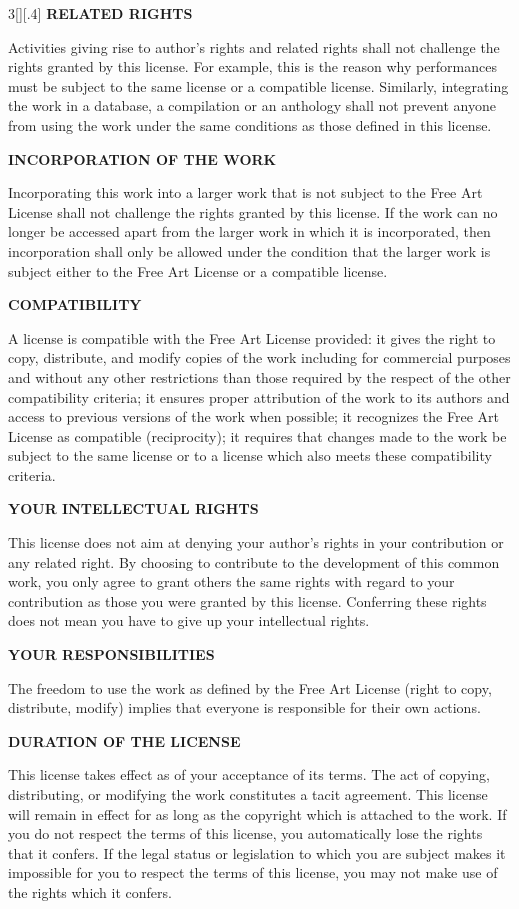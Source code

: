 \documentclass[8pt,a4paper]{article}
\begin{document}
\begin{multicols}{3}[][.4\paperwidth]
\textbf{RELATED RIGHTS}

Activities giving rise to author’s rights and related rights shall not challenge the rights granted by this license.
For example, this is the reason why performances must be subject to the same license or a compatible license. Similarly, integrating the work in a database, a compilation or an anthology shall not prevent anyone from using the work under the same conditions as those defined in this license.


\textbf{INCORPORATION OF THE WORK}

Incorporating this work into a larger work that is not subject to the Free Art License shall not challenge the rights granted by this license.
If the work can no longer be accessed apart from the larger work in which it is incorporated, then incorporation shall only be allowed under the condition that the larger work is subject either to the Free Art License or a compatible license.


\textbf{COMPATIBILITY}

A license is compatible with the Free Art License provided:
it gives the right to copy, distribute, and modify copies of the work including for commercial purposes and without any other restrictions than those required by the respect of the other compatibility criteria;
it ensures proper attribution of the work to its authors and access to previous versions of the work when possible;
it recognizes the Free Art License as compatible (reciprocity);
it requires that changes made to the work be subject to the same license or to a license which also meets these compatibility criteria.


\textbf{YOUR INTELLECTUAL RIGHTS}

This license does not aim at denying your author's rights in your contribution or any related right. By choosing to contribute to the development of this common work, you only agree to grant others the same rights with regard to your contribution as those you were granted by this license. Conferring these rights does not mean you have to give up your intellectual rights.


\textbf{YOUR RESPONSIBILITIES}

The freedom to use the work as defined by the Free Art License (right to copy, distribute, modify) implies that everyone is responsible for their own actions.


\textbf{DURATION OF THE LICENSE}

This license takes effect as of your acceptance of its terms. The act of copying, distributing, or modifying the work constitutes a tacit agreement. This license will remain in effect for as long as the copyright which is attached to the work. If you do not respect the terms of this license, you automatically lose the rights that it confers.
If the legal status or legislation to which you are subject makes it impossible for you to respect the terms of this license, you may not make use of the rights which it confers.



\end{multicols}
\end{document}
